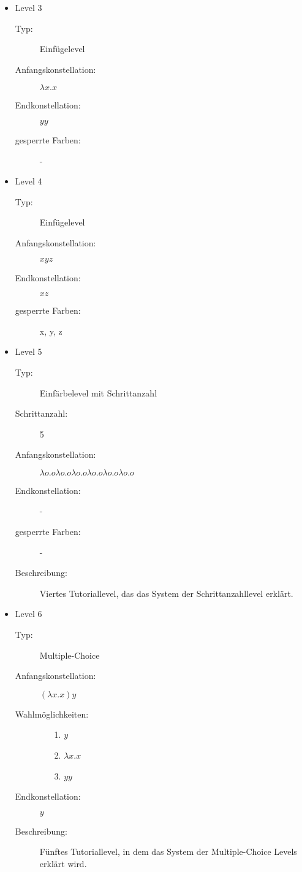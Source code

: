 \begin{itemize}
	\item{Level 3} 
		\begin{description}
			\item[Typ:] Einfügelevel
			\item[Anfangskonstellation:] \(\lambda x . x \)    
			\item[Endkonstellation:] \(y y\)
			\item[gesperrte Farben:] - 
		\end{description}

	\item{Level 4} 
		\begin{description}
			\item[Typ:] Einfügelevel
			\item[Anfangskonstellation:] \(x y z\)    
			\item[Endkonstellation:]  \(x z\)
			\item[gesperrte Farben:] x, y, z
		\end{description}

	\item{Level 5} 
		\begin{description}
			\item[Typ:] Einfärbelevel mit Schrittanzahl
			\item[Schrittanzahl:] 5
			\item[Anfangskonstellation:] \(\lambda o . o   \lambda o . o  \lambda o . o   \lambda o . o  \lambda o . o   \lambda o . o \) 
			\item[Endkonstellation:]  -
			\item[gesperrte Farben:] -
			\item[Beschreibung:] Viertes Tutoriallevel, das das System der Schrittanzahllevel erklärt.
		\end{description}

	\item{Level 6} 
		\begin{description}
			\item[Typ:] Multiple-Choice 
			\item[Anfangskonstellation:] \((\lambda x . x ) y\)    
			\item[Wahlmöglichkeiten:] \hfill
				\begin{itemize}
					\item[1.] \(y\)
					\item[2.] \(\lambda x . x \) 
					\item[3.] \(y y\)
				\end{itemize}
			\item[Endkonstellation:] \(y\)
			\item[Beschreibung:] Fünftes Tutoriallevel, in dem das System der Multiple-Choice Levels erklärt wird.
		\end{description}


\end{itemize}
